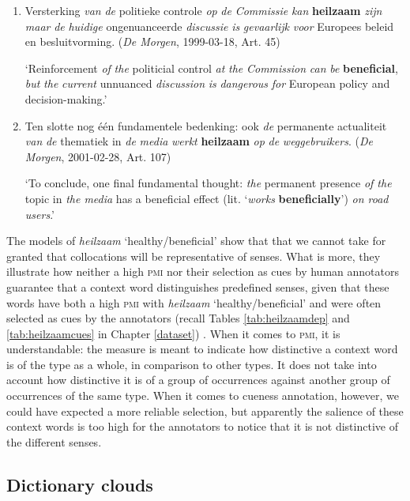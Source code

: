 \documentclass[
]{book}
\begin{document}
\begin{enumerate}
\def\labelenumi{(\arabic{enumi})}
\setcounter{enumi}{8}
\item
  Versterking \emph{van} \emph{de} politieke controle \emph{op} \emph{de} \emph{Commissie} \emph{kan} \textbf{heilzaam} \emph{zijn} \emph{maar} \emph{de} \emph{huidige} ongenuanceerde \emph{discussie} \emph{is} \emph{gevaarlijk} \emph{voor} Europees beleid en besluitvorming. (\emph{De Morgen}, 1999-03-18, Art. 45)

  `Reinforcement \emph{of} \emph{the} politicial control \emph{at} \emph{the} \emph{Commission} \emph{can} \emph{be} \textbf{beneficial}, \emph{but} \emph{the} \emph{current} unnuanced \emph{discussion} \emph{is} \emph{dangerous} \emph{for} European policy and decision-making.'
\item
  Ten slotte nog één fundamentele bedenking: ook \emph{de} permanente actualiteit \emph{van} \emph{de} thematiek in \emph{de} \emph{media} \emph{werkt} \textbf{heilzaam} \emph{op} \emph{de} \emph{weggebruikers}. (\emph{De Morgen}, 2001-02-28, Art. 107)

  `To conclude, one final fundamental thought: \emph{the} permanent presence \emph{of the} topic in \emph{the media} has a beneficial effect (lit. `\emph{works} \textbf{beneficially}') \emph{on road users}.'
\end{enumerate}

The models of \emph{heilzaam} `healthy/beneficial' show that that we cannot take for granted that collocations will be representative of senses. What is more, they illustrate how neither a high \textsc{pmi} nor their selection as cues by human annotators guarantee that a context word distinguishes predefined senses, given that these words have both a high \textsc{pmi} with \emph{heilzaam} `healthy/beneficial' and were often selected as cues by the annotators (recall Tables \ref{tab:heilzaamdep} and \ref{tab:heilzaamcues} in Chapter \ref{dataset}) .
When it comes to \textsc{pmi}, it is understandable: the measure is meant to indicate how distinctive a context word is of the type as a whole, in comparison to other types. It does not take into account how distinctive it is of a group of occurrences against another group of occurrences of the same type.
When it comes to cueness annotation, however, we could have expected a more reliable selection, but apparently the salience of these context words is too high for the annotators to notice that it is not distinctive of the different senses.

\hypertarget{schaal}{%
\subsection{Dictionary clouds}\label{schaal}}
\end{document}
